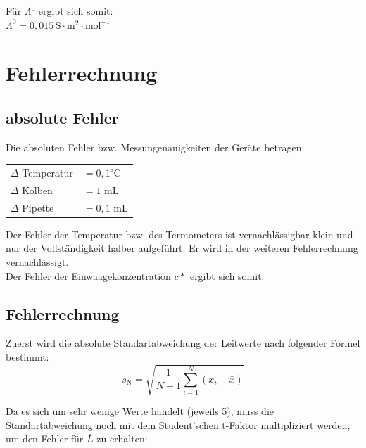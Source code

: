 \documentclass[12pt,a4paper,titlepage,headinclude,bibtotoc]{scrartcl}
\begin{document}
Für $\Lambda^0$ ergibt sich somit:\\
$\Lambda^0 = 0,015\, \mathrm{S} \cdot \mathrm{m^2} \cdot \mathrm{mol^{-1}}$\\

\newpage 

\section{Fehlerrechnung}

\subsection{absolute Fehler}
Die absoluten Fehler bzw. Messungenauigkeiten der Geräte betragen:\\

\begin{table} [h]
\centering 
\begin{tabular}{p{4cm}p{4cm}}
$\Delta$ Temperatur & $= 0,1^\circ\text{C}$ \\
$\Delta$ Kolben &$= 1$ mL   \\
$\Delta$ Pipette &  $=0,1$ mL \\
\end{tabular}
\end{table}

Der Fehler der Temperatur bzw. des Termometers ist vernachlässigbar klein und nur der Vollständigkeit halber aufgeführt. Er wird in der weiteren Fehlerrechnung vernachlässigt.\\
 Der Fehler der Einwaagekonzentration $c*$ ergibt sich somit:\\
 
 


\subsection{Fehlerrechnung}
Zuerst wird die absolute Standartabweichung der Leitwerte nach folgender Formel bestimmt:\\

\begin{equation}
s_{\mathrm{N}} = \sqrt{\frac{1}{N-1} \sum_{i=1}^{N}(x_i -\bar{x})}
\end{equation} 

Da es sich um sehr wenige Werte handelt (jeweils 5), muss die Standartabweichung noch mit dem Student'schen t-Faktor multipliziert werden, um den Fehler für $\bar{L}$ zu erhalten:\\
\end{document}
